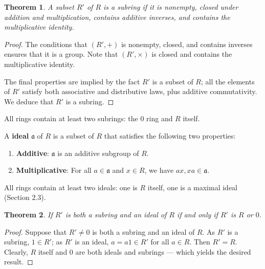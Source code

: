 \documentclass[11pt]{article}
\newtheorem{theorem}{Theorem}
\begin{document}
\begin{adjustwidth}{0.5cm}{}
	\begin{theorem}
		A subset $R'$ of $R$ is a subring if it is nonempty, closed under addition and multiplication, contains additive inverses, and contains the multiplicative identity.
	\end{theorem}
	\begin{proof}
		The conditions that $(R', +)$ is nonempty, closed, and contains inverses ensures that it is a group. Note that $(R', \times)$ is closed and contains the multiplicative identity. 

		The final properties are implied by the fact $R'$ is a subset of $R$; all the elements of $R'$ satisfy both associative and distributive laws, plus additive commutativity. We deduce that $R'$ is a subring.
	\end{proof}
\end{adjustwidth}

All rings contain at least two subrings: the $0$ ring and $R$ itself.

\newpage

A \textbf{ideal} $\mathfrak{a}$ of $R$ is a subset of $R$ that satisfies the following two properties:
\begin{enumerate}
	\item \textbf{Additive}: $\mathfrak{a}$ is an additive subgroup of $R$.
	\item \textbf{Multiplicative}: For all $a \in \mathfrak{a}$ and $x \in R$, we have $ax, xa \in \mathfrak{a}$.
\end{enumerate}

All rings contain at least two ideals: one is $R$ itself, one is a maximal ideal (Section 2.3).

\begin{adjustwidth}{0.5cm}{}
	\begin{theorem}
		If $R'$ is both a subring and an ideal of $R$ if and only if $R'$ is $R$ or $0$.
	\end{theorem}
	\begin{proof}
		Suppose that $R' \ne 0$ is both a subring and an ideal of $R$. As $R'$ is a subring, $1 \in R'$; as $R'$ is an ideal, $a = a1 \in R'$ for all $a \in R$. Then $R' = R$. Clearly, $R$ itself and $0$ are both ideals and subrings --- which yields the desired result.
	\end{proof}
\end{adjustwidth}

\end{document}
